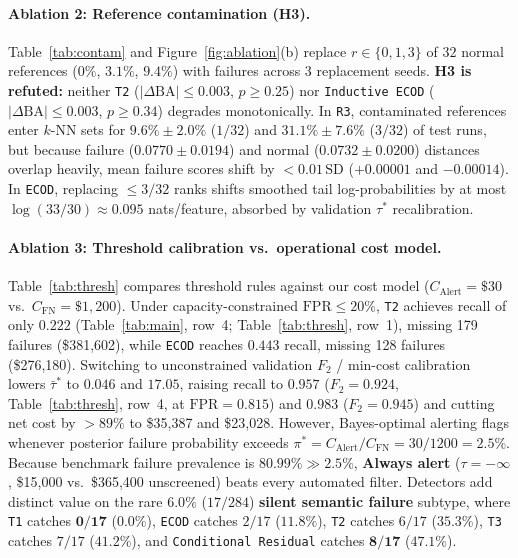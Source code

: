 \paragraph{Ablation 2: Reference contamination (H3).}
Table~\ref{tab:contam} and Figure~\ref{fig:ablation}(b) replace $r\in\{0,1,3\}$ of $32$ normal references ($0\%$, $3.1\%$, $9.4\%$) with failures across 3 replacement seeds. \textbf{H3 is refuted:} neither \texttt{T2} ($|\Delta\mathrm{BA}|\le 0.003$, $p\ge 0.25$) nor \texttt{Inductive ECOD} ($|\Delta\mathrm{BA}|\le 0.003$, $p\ge 0.34$) degrades monotonically. In \texttt{R3}, contaminated references enter $k$-NN sets for $9.6\%\pm 2.0\%$ ($1/32$) and $31.1\%\pm 7.6\%$ ($3/32$) of test runs, but because failure ($0.0770\pm 0.0194$) and normal ($0.0732\pm 0.0200$) distances overlap heavily, mean failure scores shift by $<0.01\,\mathrm{SD}$ ($+0.00001$ and $-0.00014$). In \texttt{ECOD}, replacing $\le 3/32$ ranks shifts smoothed tail log-probabilities by at most $\log(33/30)\approx 0.095$ nats/feature, absorbed by validation $\tau^*$ recalibration.

\paragraph{Ablation 3: Threshold calibration vs.\ operational cost model.}
Table~\ref{tab:thresh} compares threshold rules against our cost model ($C_{\text{Alert}}=\$30$ vs.\ $C_{\text{FN}}=\$1{,}200$). Under capacity-constrained $\mathrm{FPR}\le 20\%$, \texttt{T2} achieves recall of only $0.222$ (Table~\ref{tab:main}, row~4; Table~\ref{tab:thresh}, row~1), missing 179 failures (\$381,602), while \texttt{ECOD} reaches $0.443$ recall, missing 128 failures (\$276,180). Switching to unconstrained validation $F_2$ / min-cost calibration lowers $\bar{\tau}^*$ to $0.046$ and $17.05$, raising recall to $0.957$ ($F_2=0.924$, Table~\ref{tab:thresh}, row~4, at $\mathrm{FPR}=0.815$) and $0.983$ ($F_2=0.945$) and cutting net cost by $>89\%$ to \$35,387 and \$23,028. However, Bayes-optimal alerting flags whenever posterior failure probability exceeds $\pi^* = C_{\text{Alert}}/C_{\text{FN}} = 30/1200 = 2.5\%$. Because benchmark failure prevalence is $80.99\%\gg 2.5\%$, \textbf{Always alert} ($\tau=-\infty$, \$15,000 vs.\ \$365,400 unscreened) beats every automated filter. Detectors add distinct value on the rare $6.0\%$ ($17/284$) \textbf{silent semantic failure} subtype, where \texttt{T1} catches $\mathbf{0/17}$ ($\mathbf{0.0\%}$), \texttt{ECOD} catches $2/17$ ($11.8\%$), \texttt{T2} catches $6/17$ ($35.3\%$), \texttt{T3} catches $7/17$ ($41.2\%$), and \texttt{Conditional Residual} catches $\mathbf{8/17}$ ($\mathbf{47.1\%}$).

